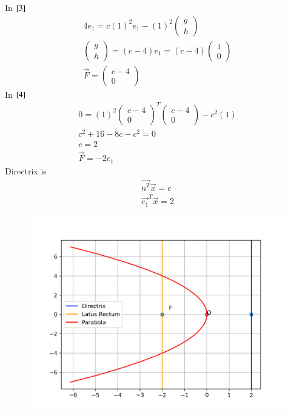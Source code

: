 \documentclass[a5paper,10pt]{article}
\begin{document}
In $\eqref{3}$
\begin{align}
    4e_1=c(1)^2e_1-(1)^2\begin{pmatrix}g\\h\end{pmatrix}\\
    \begin{pmatrix}g\\h\end{pmatrix}=(c-4)e_1=(c-4)\begin{pmatrix}1\\0\end{pmatrix}\\
    \vec{F}=\begin{pmatrix}c-4\\0\end{pmatrix}
\end{align}
In $\eqref{4}$
\begin{align}
    0=(1)^2\begin{pmatrix}c-4\\0\end{pmatrix}^T\begin{pmatrix}c-4\\0\end{pmatrix}-c^2(1)\\
    c^2+16-8c-c^2=0\\
    c=2\\
    \vec{F}=-2e_1
\end{align}
Directrix is
\begin{align}
    \vec{n^T}\vec{x}=c\\
    \vec{e_1}^T\vec{x}=2
\end{align}
\begin{figure}[H]
    \centering
    \includegraphics[width=\columnwidth]{figs/figure.png}
    \caption{}
    \label{fig:placeholder}
\end{figure}
\end{document}
